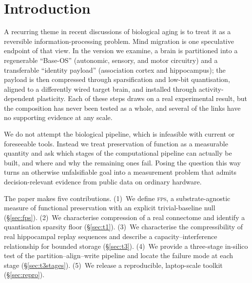 \documentclass[11pt]{article}
\newcommand{\fps}{\textsc{fps}}
\begin{document}
\begin{abstract}
Taken together, compression of neural data is a quantifiable phenomenon, while migration of
function across substrates is not supported by the proposed pipeline on the systems we can
currently test. We release \fps, the dataset loaders, and the full set of operations as a
measurement toolkit.

\medskip
\noindent\textbf{Scope.} All results are obtained on a 306-neuron nematode connectome, small
recurrent networks, and reflex- or trajectory-scale functions. They say nothing about reading or
writing a living human brain. The biological prerequisites for the full pipeline remain absent,
and we make no claim about them; the studies test coherence in simulation, not biological
feasibility.
\end{abstract}

\section{Introduction}
A recurring theme in recent discussions of biological aging is to treat it as a reversible
information-processing problem. Mind migration is one speculative endpoint of that view. In the
version we examine, a brain is partitioned into a regenerable ``Base-OS'' (autonomic, sensory, and
motor circuitry) and a transferable ``identity payload'' (association cortex and hippocampus);
the payload is then compressed through sparsification and low-bit quantisation, aligned to a
differently wired target brain, and installed through activity-dependent plasticity. Each of
these steps draws on a real experimental result, but the composition has never been tested as a
whole, and several of the links have no supporting evidence at any scale.

We do not attempt the biological pipeline, which is infeasible with current or foreseeable tools.
Instead we treat preservation of function as a measurable quantity and ask which stages of the
computational pipeline can actually be built, and where and why the remaining ones fail. Posing
the question this way turns an otherwise unfalsifiable goal into a measurement problem that admits
decision-relevant evidence from public data on ordinary hardware.

The paper makes five contributions. (1)~We define \fps, a substrate-agnostic measure of functional
preservation with an explicit trivial-baseline null (\S\ref{sec:fps}). (2)~We characterise
compression of a real connectome and identify a quantisation sparsity floor (\S\ref{sec:t1}).
(3)~We characterise the compressibility of real hippocampal replay sequences and describe a
capacity--interference relationship for bounded storage (\S\ref{sec:t3}). (4)~We provide a
three-stage in-silico test of the partition--align--write pipeline and locate the failure mode at
each stage (\S\ref{sec:t3stages}). (5)~We release a reproducible, laptop-scale toolkit
(\S\ref{sec:repro}).
\end{document}

